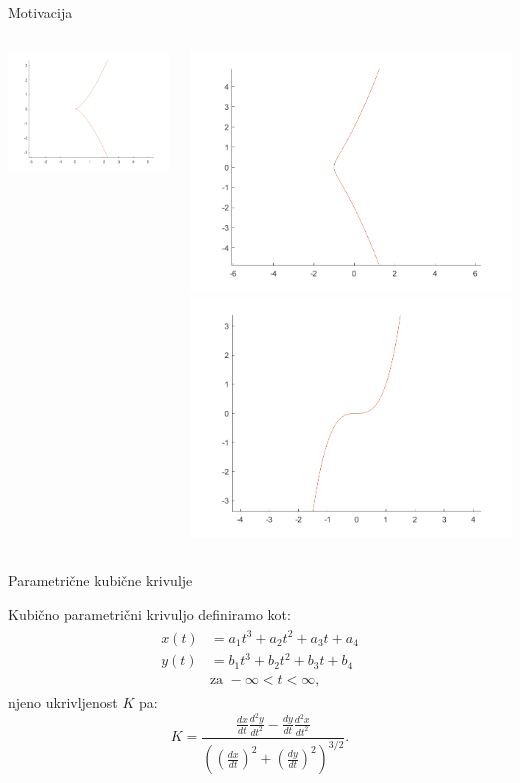 \documentclass{beamer} %
\begin{document}
\begin{frame}{Motivacija}
\begin{columns}[T]
\begin{center}
	\includegraphics[width=0.6\columnwidth]{cusp.png}
	\end{center}
	\begin{center}
	\includegraphics[width=0.6\columnwidth]{prevoj.png}
	\includegraphics[width=0.6\columnwidth]{no_sing.png}
\end{center}
\end{columns}

\end{frame}

\begin{frame} {Parametrične kubične krivulje}

Kubično parametrični krivuljo definiramo kot:
	\begin{align}
	\begin{split}
	x(t) &= a_1t^3+a_2t^2+a_3t+a_4 \\
	y(t) &= b_1t^3+b_2t^2+b_3t+b_4 \\
	&\text {za } -\infty < t < \infty \text{,}
	\label{param}
	\end{split}
	\end{align}
	njeno ukrivljenost $K$ pa:
	\[K = \frac{\frac{dx}{dt}\frac{d^2y}{dt^2} - \frac{dy}{dt}\frac{d^2x}{dt^2}}{\left((\frac{dx}{dt})^{2} +(\frac{dy}{dt})^2\right)^{3/2}}\text{.}\]

\end{frame}
\end{document}
